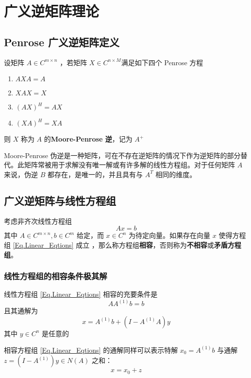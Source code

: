 \chapter{广义逆矩阵理论}
\section{Penrose 广义逆矩阵定义}
设矩阵 $A \in C^{m \times n}$ ，若矩阵 $X \in C^{n \times M}$满足如下四个 Penrose 方程
\begin{enumerate}
    \item $AXA=A$
    \item $XAX=X$
    \item $(AX)^H=AX$
    \item $(XA)^H=XA$
\end{enumerate}
则 $X$ 称为 $A$ 的\textbf{Moore-Penrose 逆}，记为 $A^+$

Moore-Penrose 伪逆是一种矩阵，可在不存在逆矩阵的情况下作为逆矩阵的部分替代。此矩阵常被用于求解没有唯一解或有许多解的线性方程组。对于任何矩阵 $A$ 来说，伪逆 $B$ 都存在，是唯一的，并且具有与 $A^T $ 相同的维度。


\section{广义逆矩阵与线性方程组}
考虑非齐次线性方程组
\begin{equation}
    Ax=b
    \label{Eq.Linear_Eqtions}
\end{equation}
其中 $A \in C^{m \times n} ,b\in C^{m}$ 给定，而 $x\in C^n$ 为待定向量。如果存在向量 $x$ 使得方程组 \ref{Eq.Linear_Eqtions} 成立 ，那么称方程组\textbf{相容}，否则称为\textbf{不相容}或\textbf{矛盾方程组}。

\subsection{线性方程组的相容条件极其解}
线性方程组 \ref{Eq.Linear_Eqtions} 相容的充要条件是
\begin{equation}
    AA^{(1)}b=b
\end{equation}
且其通解为
\begin{equation}
    x=A^{(1)}b+(I-A^{(1)}A)y
\end{equation}
其中 $y\in C^n$ 是任意的

相容方程组 \ref{Eq.Linear_Eqtions} 的通解同样可以表示特解 $x_0=A^{(1)}b$ 与通解 $z=(I-A^{(1)})y\in N(A)$ 之和：
\begin{equation}
    x=x_0+z
\end{equation}

